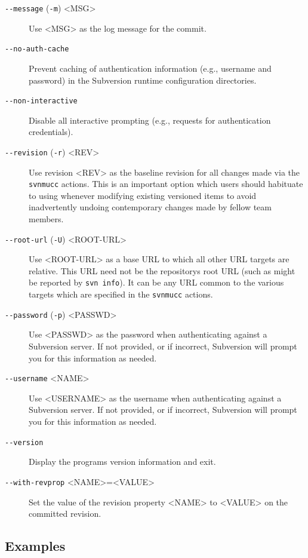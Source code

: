 \begin{description}
\item[\texttt{-\/-message} (\texttt{-m}) \textless MSG\textgreater{}]
Use \textless MSG\textgreater{} as the log message for the commit.
\item[\texttt{-\/-no-auth-cache}]
Prevent caching of authentication information (e.g., username and
password) in the Subversion runtime configuration directories.
\item[\texttt{-\/-non-interactive}]
Disable all interactive prompting (e.g., requests for authentication
credentials).
\item[\texttt{-\/-revision} (\texttt{-r}) \textless REV\textgreater{}]
Use revision \textless REV\textgreater{} as the baseline revision for
all changes made via the \texttt{svnmucc} actions. This is an important
option which users should habituate to using whenever modifying existing
versioned items to avoid inadvertently undoing contemporary changes made
by fellow team members.
\item[\texttt{-\/-root-url} (\texttt{-U})
\textless ROOT-URL\textgreater{}]
Use \textless ROOT-URL\textgreater{} as a base URL to which all other
URL targets are relative. This URL need not be the
repository\textquotesingle s root URL (such as might be reported by
\texttt{svn\ info}). It can be any URL common to the various targets
which are specified in the \texttt{svnmucc} actions.
\item[\texttt{-\/-password} (\texttt{-p})
\textless PASSWD\textgreater{}]
Use \textless PASSWD\textgreater{} as the password when authenticating
against a Subversion server. If not provided, or if incorrect,
Subversion will prompt you for this information as needed.
\item[\texttt{-\/-username} \textless NAME\textgreater{}]
Use \textless USERNAME\textgreater{} as the username when authenticating
against a Subversion server. If not provided, or if incorrect,
Subversion will prompt you for this information as needed.
\item[\texttt{-\/-version}]
Display the program\textquotesingle s version information and exit.
\item[\texttt{-\/-with-revprop}
\textless NAME\textgreater=\textless VALUE\textgreater{}]
Set the value of the revision property \textless NAME\textgreater{} to
\textless VALUE\textgreater{} on the committed revision.
\end{description}

\subsection{Examples}\label{svn.ref.svnmucc.re.examples}


